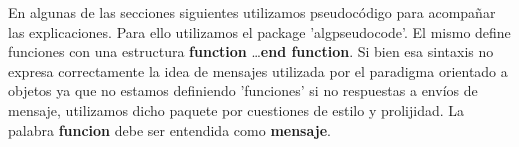 En algunas de las secciones siguientes utilizamos pseudocódigo para acompañar las explicaciones. Para ello utilizamos el package 'algpseudocode'. 
El mismo define funciones con una estructura \textbf{function} \ldots \textbf{end function}. Si bien esa sintaxis no expresa correctamente la idea de mensajes
utilizada por el paradigma orientado a objetos ya que no estamos definiendo 'funciones' si no respuestas a envíos de mensaje, utilizamos dicho paquete por cuestiones
de estilo y prolijidad. La palabra \textbf{funcion} debe ser entendida como \textbf{mensaje}.
